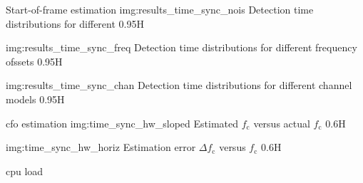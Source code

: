
\begin{subchapter}{Start-of-frame estimation}
               {img:results_time_sync_nois}
               {Detection time distributions for different }
               {0.95}{H}

               {img:results_time_sync_freq}
               {Detection time distributions for different frequency ofssets}
               {0.95}{H}

               {img:results_time_sync_chan}
               {Detection time distributions for different channel models}
               {0.95}{H}
\end{subchapter}

\begin{subchapter}{\Acrlong{cfo} estimation}
                  {img:time_sync_hw_sloped}
                  {Estimated $f_\text{c}$ versus actual $f_\text{c}$}
                  {0.6}{H}

                  {img:time_sync_hw_horiz}
                  {Estimation error $\Delta f_\text{c}$ versus $f_\text{c}$}
                  {0.6}{H}
\end{subchapter}

\begin{subchapter}{\Acrshort{cpu} load}
\end{subchapter}

